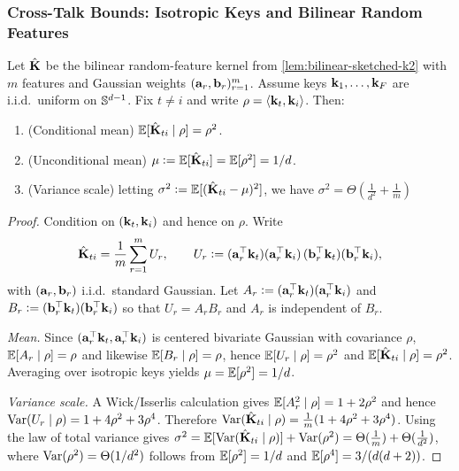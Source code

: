 \subsubsection{Cross-Talk Bounds: Isotropic Keys and Bilinear Random Features}
\begin{lemma}
\label{lem:bilinear-mean-var}
Let $\hat{\mathbf{K}}$ be the bilinear random-feature kernel from \cref{lem:bilinear-sketched-k2} with $m$ features and
Gaussian weights $({\mathbf{a}}_{r},{\mathbf{b}}_{r})_{r=1}^m$.
Assume keys ${\mathbf{k}}_{1},\dots,{\mathbf{k}}_{F}$ are i.i.d.\ uniform on $\mathbb{S}^{d-1}$.
Fix $t\neq i$ and write $\rho=\langle {{\mathbf{k}}_t}, {{\mathbf{k}}_i} \rangle$.
Then:
\begin{enumerate}[leftmargin=2.2em]
\item (Conditional mean) $\mathbb{E}[\hat{\mathbf{K}}_{ti}\mid \rho]=\rho^2$.
\item (Unconditional mean) $\mu\vcentcolon= \mathbb{E}[\hat{\mathbf{K}}_{ti}]=\mathbb{E}[\rho^2]=1/d$.
\item (Variance scale) letting $\sigma^2\vcentcolon= \mathbb{E}[(\hat{\mathbf{K}}_{ti}-\mu)^2]$, we have
$\sigma^2=\Theta(\tfrac{1}{d^2}+\tfrac{1}{m})$ %
\end{enumerate}
\end{lemma}

\begin{proof}

Condition on $({\mathbf{k}}_{t},{\mathbf{k}}_{i})$ and hence on $\rho$.
Write
\[
\hat{\mathbf{K}}_{ti}=\frac{1}{m}\sum_{r=1}^m U_{r},
\qquad
U_{r} \vcentcolon= ({\mathbf{a}}_{r}^\top {\mathbf{k}}_{t})({\mathbf{a}}_{r}^\top {\mathbf{k}}_{i})\,({\mathbf{b}}_{r}^\top {\mathbf{k}}_{t})({\mathbf{b}}_{r}^\top {\mathbf{k}}_{i}),
\]
with $({\mathbf{a}}_{r},{\mathbf{b}}_{r})$ i.i.d.\ standard Gaussian.
Let $A_{r}\vcentcolon= ({\mathbf{a}}_{r}^\top {\mathbf{k}}_{t})({\mathbf{a}}_{r}^\top {\mathbf{k}}_{i})$ and $B_{r}\vcentcolon= ({\mathbf{b}}_{r}^\top {\mathbf{k}}_{t})({\mathbf{b}}_{r}^\top {\mathbf{k}}_{i})$ so that $U_{r}=A_rB_{r}$
and $A_{r}$ is independent of $B_{r}$.

\emph{Mean.}
Since $({\mathbf{a}}_{r}^\top {\mathbf{k}}_{t},{\mathbf{a}}_{r}^\top {\mathbf{k}}_{i})$ is centered bivariate Gaussian with covariance $\rho$,
$\mathbb{E}[A_{r}\mid \rho]=\rho$ and likewise $\mathbb{E}[B_{r}\mid\rho]=\rho$, hence
$\mathbb{E}[U_{r}\mid\rho]=\rho^2$ and $\mathbb{E}[\hat{\mathbf{K}}_{ti}\mid\rho]=\rho^2$.
Averaging over isotropic keys yields $\mu=\mathbb{E}[\rho^2]=1/d$.

\emph{Variance scale.}
A Wick/Isserlis calculation gives $\mathbb{E}[A_{r}^2\mid\rho]=1+2\rho^2$ and hence
$\mathrm{Var}(U_{r}\mid\rho)=1+4\rho^2+3\rho^4$.
Therefore
$\mathrm{Var}(\hat{\mathbf{K}}_{ti}\mid\rho)=\tfrac{1}{m}(1+4\rho^2+3\rho^4)$.
Using the law of total variance gives
\(
\sigma^2=\mathbb{E}[\mathrm{Var}(\hat{\mathbf{K}}_{ti}\mid\rho)]+\mathrm{Var}(\rho^2)
=\Theta(\tfrac{1}{m})+\Theta(\tfrac{1}{d^2})
\),
where $\mathrm{Var}(\rho^2)=\Theta(1/d^2)$ follows from $\mathbb{E}[\rho^2]=1/d$ and $\mathbb{E}[\rho^4]=3/(d(d+2))$.
\end{proof}

